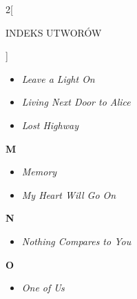 \documentclass[a4paper]{report}
\begin{document}
\begin{multicols*}{2}[\begin{Huge}INDEKS UTWORÓW\end{Huge}\vspace{1cm}]
\begin{minipage}{\columnwidth}
\begin{itemize}[topsep=6pt, after=\vspace{1.5mm}, leftmargin=0mm]
		\item[]  \textit{Leave a Light On}  \\
	\end{itemize}
\end{minipage}
\begin{minipage}{\columnwidth}
	\begin{itemize}[topsep=6pt, after=\vspace{5mm}, leftmargin=0mm]
		\itemsep0em
		\item[]  \textit{Living Next Door to Alice}  \\
		\item[]  \textit{Lost Highway}  \\
	\end{itemize}
\end{minipage}
\begin{minipage}{\columnwidth}
\begin{Large}
		\textbf{M}
	\end{Large} 
	\begin{itemize}[topsep=6pt, after=\vspace{5mm}, leftmargin=0mm]
		\itemsep0em
		\item[]\textit{Memory}  \\
		\item[]  \textit{My Heart Will Go On}  \\
	\end{itemize}
\end{minipage}
\begin{minipage}{\columnwidth}
\begin{Large}
		\textbf{N}
	\end{Large} 
	\begin{itemize}[topsep=6pt, after=\vspace{5mm}, leftmargin=0mm]
		\itemsep0em
		\item[]\textit{Nothing Compares to You}  \\
	\end{itemize}
\end{minipage}
\begin{minipage}{\columnwidth}
\begin{Large}
		\textbf{O}
	\end{Large} 
	\begin{itemize}[topsep=6pt, after=\vspace{5mm}, leftmargin=0mm]
		\itemsep0em
		\item[]\textit{One of Us}  \\

\end{itemize}
\end{minipage}
\end{multicols*}
\end{document}
